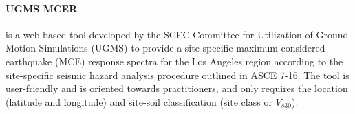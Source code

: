 \paragraph{UGMS MCER}  \citep{crouse2018sitespecific} is a web-based tool developed by the SCEC Committee for Utilization of Ground Motion Simulations (UGMS) to provide a site-specific maximum considered earthquake (MCE) response spectra for the Los Angeles region according to the site-specific seismic hazard analysis procedure outlined in ASCE 7-16. The tool is user-friendly and is oriented towards practitioners, and only requires the location (latitude and longitude) and site-soil classification (site class or $V_{s30}$).